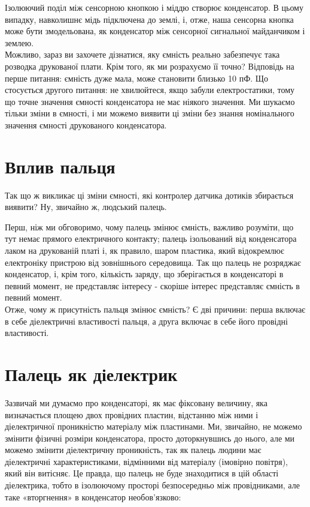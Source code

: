\documentclass[a4paper,fontsize=12]{report}
\begin{document}
  \begin{figure}[h]
  \end{figure}


  Ізолюючий поділ між сенсорною кнопкою і міддю створює конденсатор. В цьому випадку, навколишнє мідь підключена до землі, і, отже, наша сенсорна кнопка може бути змодельована, як конденсатор між сенсорної сигнальної майданчиком і землею.\\

  Можливо, зараз ви захочете дізнатися, яку ємність реально забезпечує така розводка друкованої плати. Крім того, як ми розрахуємо її точно? Відповідь на перше питання: ємність дуже мала, може становити близько 10 пФ. Що стосується другого питання: не хвилюйтеся, якщо забули електростатики, тому що точне значення ємності конденсатора не має ніякого значення. Ми шукаємо тільки зміни в ємності, і ми можемо виявити ці зміни без знання номінального значення ємності друкованого конденсатора.\\
\section{Вплив пальця}

  Так що ж викликає ці зміни ємності, які контролер датчика дотиків збирається виявити? Ну, звичайно ж, людський палець.

  \begin{figure}[h]
  \end{figure}
  Перш, ніж ми обговоримо, чому палець змінює ємність, важливо розуміти, що тут немає прямого електричного контакту; палець ізольований від конденсатора лаком на друкованій платі і, як правило, шаром пластика, який відокремлює електроніку пристрою від зовнішнього середовища. Так що палець не розряджає конденсатор, і, крім того, кількість заряду, що зберігається в конденсаторі в певний момент, не представляє інтересу - скоріше інтерес представляє ємність в певний момент.\\

  Отже, чому ж присутність пальця змінює ємність? Є дві причини: перша включає в себе діелектричні властивості пальця, а друга включає в себе його провідні властивості.
\section{Палець як діелектрик}

  Зазвичай ми думаємо про конденсаторі, як має фіксовану величину, яка визначається площею двох провідних пластин, відстанню між ними і діелектричної проникністю матеріалу між пластинами. Ми, звичайно, не можемо змінити фізичні розміри конденсатора, просто доторкнувшись до нього, але ми можемо змінити діелектричну проникність, так як палець людини має діелектричні характеристиками, відмінними від матеріалу (імовірно повітря), який він витісняє. Це правда, що палець не буде знаходитися в цій області діелектрика, тобто в ізолюючому просторі безпосередньо між провідниками, але таке «вторгнення» в конденсатор необов'язково:
\end{document}
